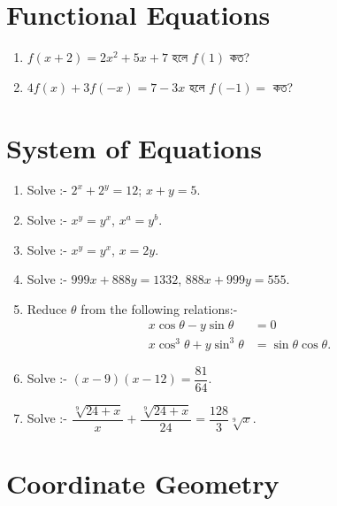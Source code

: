 \documentclass[11pt, a4paper]{article}
\begin{document}
\section{Functional Equations}

\begin{enumerate}

	\item $ f(x+2) = 2x^2 +5x+7 $ \textbengali{হলে} $ f(1) $ \textbengali{কত}?
	

	\item $ 4f(x) + 3f(-x) = 7 - 3x $ \textbengali{হলে} $ f(-1) = $  \textbengali{কত?}

\end{enumerate}

\section{System of Equations}

\begin{enumerate}

	\item Solve :- $ 2^x + 2^y = 12  $; $ x+y = 5 $.
	\item Solve :- $ x^y = y^x $, $ x^a = y^b $.
	
	\item Solve :- $ x^y = y^x $, $ x = 2y $.
	
	\item Solve :- $ 999x + 888y = 1332 $, $ 888x + 999y = 555 $.

	\item Reduce $\theta$ from the following relations:-
	\begin{align*}
	x\cos \theta - y \sin \theta &= 0 \\
	x\cos^3 \theta + y \sin^3 \theta &= \sin \theta \cos \theta.
	\end{align*}
	
	\item Solve :- $\left( x - 9 \right) \left( x - 12 \right) = \dfrac{81}{64}$.
	
	\item Solve :- $\dfrac{\sqrt[9]{24+x}}{x} + \dfrac{\sqrt[9]{24+x}}{24} = \dfrac{128}{3} \sqrt[9]{x}$.

\end{enumerate}


\section{Coordinate Geometry}
\end{document}
